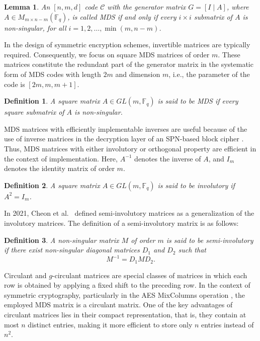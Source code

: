 \documentclass[12pt]{article}
\newtheorem{definition}{Definition}
\newtheorem{lemma}{Lemma}
\begin{document}
\begin{lemma}\cite{macwilliams1977theory}
	An $[n,m,d]$ code $\mathcal{C}$ with the generator matrix $G = [I \mid A]$, where $A\in M_{m\times {n-m}}(\mathbb{F}_q)$, is called \textit{MDS} if and only if every $i \times i$ submatrix of $A$ is non-singular, for all $i = 1, 2, \ldots, \min(m,n-m)$.
\end{lemma}
In the design of symmetric encryption schemes, invertible matrices are typically required. Consequently, we focus on square MDS matrices of order \( m \). These matrices constitute the redundant part of the generator matrix in the systematic form of MDS codes with length \( 2m \) and dimension \( m \), i.e., the parameter of the code is $[2m,m,m+1]$.


\begin{definition}
	A square matrix $A\in GL(m,\mathbb{F}_q) $  is said to be \textit{MDS} if every square submatrix of $A$ is non-singular.
\end{definition}
MDS matrices with efficiently implementable inverses are useful because of the use of inverse matrices in the decryption layer of an SPN-based block cipher \cite{daemen2002design}. Thus, MDS matrices with either involutory or orthogonal property are efficient in the context of implementation. Here, $A^{-1}$ denotes the inverse of $A$, and $I_m$ denotes the identity matrix of order $m$.

\begin{definition}
	A square matrix $A\in GL(m,\mathbb{F}_q)$  is said to be \textit{involutory} if $A^2 = I_m$.
\end{definition}

In 2021, Cheon et al.\ \cite{cheon2021semi} defined semi-involutory matrices as a generalization of the involutory matrices. The definition of a semi-involutory matrix is as follows:

\begin{definition}
	A non-singular matrix $M$ of order $m$ is said to be \textit{semi-involutory} if there exist non-singular diagonal matrices $D_1$ and $D_2$ such that
	\[
	M^{-1} = D_1 M D_2.
	\]
\end{definition}

Circulant and \( g \)-circulant matrices are special classes of matrices in which each row is obtained by applying a fixed shift to the preceding row. In the context of symmetric cryptography, particularly in the AES MixColumns operation \cite[Chapter-4]{paar2010understanding}, the employed MDS matrix is a circulant matrix. One of the key advantages of circulant matrices lies in their compact representation, that is, they contain at most \( n \) distinct entries, making it more efficient to store only \( n \) entries instead of \( n^2 \).
\end{document}
